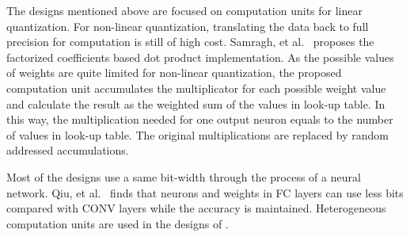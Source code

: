 The designs mentioned above are focused on computation units for linear quantization. For non-linear quantization, translating the data back to full precision for computation is still of high cost. Samragh, et al.~\cite{samragh2017customizing} proposes the factorized coefficients based dot product implementation. As the possible values of weights are quite limited for non-linear quantization, the proposed computation unit accumulates the multiplicator for each possible weight value and calculate the result as the weighted sum of the values in look-up table. In this way, the multiplication needed for one output neuron equals to the number of values in look-up table. The original multiplications are replaced by random addressed accumulations.

Most of the designs use a same bit-width through the process of a neural network. Qiu, et al.~\cite{qiu2016going} finds that neurons and weights in FC layers can use less bits compared with CONV layers while the accuracy is maintained. Heterogeneous computation units are used in the designs of \cite{zhao2017accelerating, guo2017bit}.

